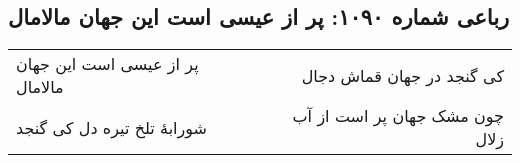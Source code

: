 \begin{center}
\section*{رباعی شماره ۱۰۹۰: پر از عیسی است این جهان مالامال}
\label{sec:1090}
\begin{longtable}{l p{0.5cm} r}
پر از عیسی است این جهان مالامال
&&
کی گنجد در جهان قماش دجال
\\
شورابهٔ تلخ تیره دل کی گنجد
&&
چون مشک جهان پر است از آب زلال
\\
\end{longtable}
\end{center}

